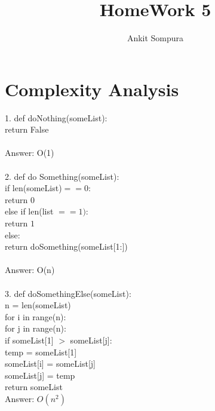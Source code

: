 \documentclass[11pt]{article}
\title{HomeWork 5}
\author{Ankit Sompura}
\begin{document}
\maketitle

\section{Complexity Analysis}


	1.	\indent def doNothing(someList):\\
			\indent \indent \indent return False\\\\
			Answer: O(1)\\\\
	2. 	\indent def do Something(someList):\\
	\indent \indent \indent if len(someList)$ == 0:$ \\
	\indent \indent \indent \indent return $0$\\
	\indent \indent \indent else if len(list $ == 1):$\\
	\indent \indent \indent \indent return $1$\\
	\indent \indent \indent else:\\
	\indent \indent \indent \indent return doSomething(someList[1:])\\\\
	Answer: O(n)\\\\

	3. \indent def doSomethingElse(someList):\\
			\indent \indent \indent \indent  n = len(someList)\\
			\indent \indent \indent \indent for i in range(n):\\
			\indent \indent \indent \indent \indent for j in range(n):\\
			\indent \indent \indent \indent \indent \indent if someList[1] $>$
			 someList[j]:\\
			\indent \indent \indent \indent \indent \indent \indent temp = someList[1]\\
			\indent \indent \indent \indent \indent \indent \indent someList[i] = someList[j] \\
			\indent \indent \indent \indent \indent \indent \indent someList[j] = temp\\
			\indent \indent \indent \indent return someList \\
			Answer: $O(n^2)$\\\
\end{document}
